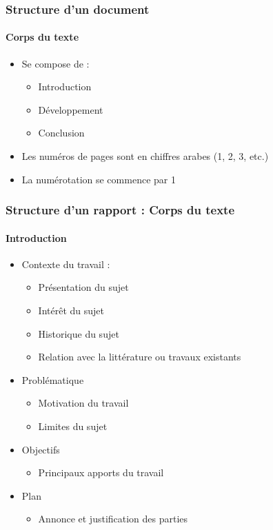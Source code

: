 \documentclass[xcolor=table]{beamer}
\begin{document}
\begin{frame}
\frametitle{Structure d'un document}
\framesubtitle{Corps du texte}

\begin{itemize}
	\item Se compose de : 
	\begin{itemize}
		\item Introduction
		\item Développement  
		\item Conclusion 
	\end{itemize}
	\item Les numéros de pages sont en chiffres arabes (1, 2, 3, etc.) 
	\item La numérotation se commence par 1 
\end{itemize}

\end{frame}

\begin{frame}
\frametitle{Structure d'un rapport : Corps du texte}
\framesubtitle{Introduction}

\begin{minipage}{0.60\textwidth}
	\begin{itemize}
		\item Contexte du travail :
		\begin{itemize}
			\item Présentation du sujet
			\item Intérêt du sujet
			\item Historique du sujet
			\item Relation avec la littérature ou travaux existants
		\end{itemize}
		
		\item Problématique 
		\begin{itemize}
			\item Motivation du travail
			\item Limites du sujet
		\end{itemize}
		
		\item Objectifs 
		\begin{itemize}
			\item Principaux apports du travail
		\end{itemize}
		
		\item Plan 
		\begin{itemize}
			\item Annonce et justification des parties
		\end{itemize}
		
	\end{itemize}
\end{minipage}
\begin{minipage}{0.38\textwidth}
\end{minipage}

\end{frame}
\end{document}
